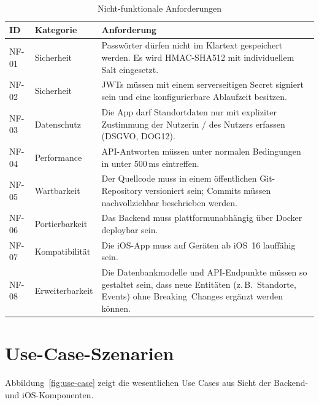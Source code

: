 \begin{table}[H]
  \centering
  \caption{Nicht-funktionale Anforderungen}
  \label{tab:nfas}
  \begin{tabularx}{\textwidth}{|l|l|Y|}
    \hline
    \textbf{ID} & \textbf{Kategorie} & \textbf{Anforderung} \\
    \hline
    NF-01 & Sicherheit   & Passwörter dürfen nicht im Klartext gespeichert werden.
                           Es wird HMAC-SHA512 mit individuellem Salt eingesetzt. \\
    \hline
    NF-02 & Sicherheit   & JWTs müssen mit einem serverseitigen Secret signiert sein und
                           eine konfigurierbare Ablaufzeit besitzen. \\
    \hline
    NF-03 & Datenschutz  & Die App darf Standortdaten nur mit expliziter Zustimmung der
                           Nutzerin / des Nutzers erfassen (DSGVO, DOG12). \\
    \hline
    NF-04 & Performance  & API-Antworten müssen unter normalen Bedingungen in unter
                           500\,ms eintreffen. \\
    \hline
    NF-05 & Wartbarkeit  & Der Quellcode muss in einem öffentlichen Git-Repository
                           versioniert sein; Commits müssen nachvollziehbar beschrieben
                           werden. \\
    \hline
    NF-06 & Portierbarkeit & Das Backend muss plattformunabhängig über Docker deploybar
                           sein. \\
    \hline
    NF-07 & Kompatibilität & Die iOS-App muss auf Geräten ab iOS~16 lauffähig sein. \\
    \hline
    NF-08 & Erweiterbarkeit & Die Datenbankmodelle und API-Endpunkte müssen so gestaltet
                           sein, dass neue Entitäten (z.\,B.\ Standorte, Events) ohne
                           Breaking~Changes ergänzt werden können. \\
    \hline
  \end{tabularx}
\end{table}

\section{Use-Case-Szenarien}
\label{sec:use-cases}

Abbildung~\ref{fig:use-case} zeigt die wesentlichen Use Cases aus Sicht der Backend- und
iOS-Komponenten.

